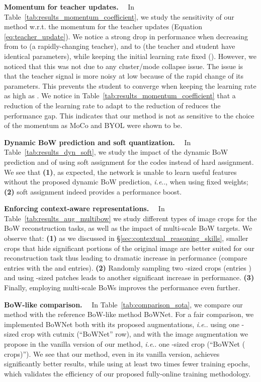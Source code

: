 \documentclass[final]{cvpr}
\makeatletter
\newcommand{\parag}[1]{\smallskip\noindent\textbf{#1}~~}
\DeclareRobustCommand\onedot{\futurelet\@let@token\@onedot}
\def\@onedot{\ifx\@let@token.\else.\null\fi\xspace}
\def\ie{\emph{i.e}\onedot} \def\Ie{\emph{I.e}\onedot}
\makeatother
\begin{document}
\parag{Momentum for teacher updates.}
In Table~\ref{tab:results_momentum_coefficient}, we study the sensitivity of our method w.r.t. the momentum  for the teacher updates (Equation \ref{eq:teacher_update}).
We notice a strong drop in performance when decreasing  from  to  (a rapidly-changing teacher), and to  (the teacher and student have identical parameters), while keeping the initial learning rate fixed ().
However, we noticed that this was not due to any cluster/mode collapse issue. 
The issue is that the teacher signal is more noisy at low  because of the rapid change of its parameters. This prevents the student to converge when keeping the learning rate as high as . We notice in Table~\ref{tab:results_momentum_coefficient} that a reduction of the learning rate to adapt to the reduction of  reduces the performance gap. This indicates that our method is not as sensitive to the choice of the momentum as MoCo and BYOL were shown to be.

\parag{Dynamic BoW prediction and soft quantization.}
In Table~\ref{tab:results_dyn_soft}, we study the impact of the dynamic BoW prediction and of using soft assignment for the codes instead of hard assignment. We see that
\textbf{(1)}, as expected, the network is unable to learn useful features without the proposed dynamic BoW prediction, 
\ie, when using fixed weights;
\textbf{(2)} soft assignment indeed provides a performance boost.

\parag{Enforcing context-aware representations.}
In Table~\ref{tab:results_aug_multibow} we study different types of image crops for the BoW reconstruction tasks, as well as the impact of multi-scale BoW targets.
We observe that: \textbf{(1)}
as we discussed in \S\ref{sec:contextual_reasoning_skills}, smaller crops that hide significant portions of the original image are better suited for our reconstruction task thus leading to dramatic increase in performance (compare entries  with the  and  entries).
\textbf{(2)}
Randomly sampling two -sized crops (entries ) and using -sized patches leads to another significant increase in performance.
\textbf{(3)} Finally, employing multi-scale BoWs improves the performance even further.

\parag{BoW-like comparison.}
In Table~\ref{tab:comparison_sota}, we compare our method with the reference BoW-like method BoWNet.
For a fair comparison, we implemented BoWNet both with its proposed augmentations, \ie using one -sized crop with cutmix (``BoWNet'' row), and with the image augmentation we propose in the vanilla version of our method, \ie one -sized crop (``BoWNet ( crops)'').
We see that our method, even in its vanilla version, achieves significantly better results, while using at least two times fewer training epochs, which validates the efficiency of our proposed fully-online training methodology.
\end{document}

